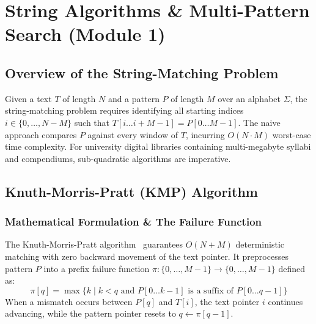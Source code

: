 \chapter{String Algorithms \& Multi-Pattern Search (Module 1)}
\label{ch:string_algorithms}

\section{Overview of the String-Matching Problem}
Given a text $T$ of length $N$ and a pattern $P$ of length $M$ over an alphabet $\Sigma$, the string-matching problem requires identifying all starting indices $i \in \{0, \dots, N - M\}$ such that $T[i \dots i + M - 1] = P[0 \dots M - 1]$. The naive approach compares $P$ against every window of $T$, incurring $O(N \cdot M)$ worst-case time complexity. For university digital libraries containing multi-megabyte syllabi and compendiums, sub-quadratic algorithms are imperative.

\section{Knuth-Morris-Pratt (KMP) Algorithm}
\subsection{Mathematical Formulation \& The Failure Function}
The Knuth-Morris-Pratt algorithm~\cite{kmp1977} guarantees $O(N + M)$ deterministic matching with zero backward movement of the text pointer. It preprocesses pattern $P$ into a prefix failure function $\pi: \{0, \dots, M - 1\} \to \{0, \dots, M - 1\}$ defined as:
\begin{equation}
\pi[q] = \max \{ k \mid k < q \text{ and } P[0 \dots k - 1] \text{ is a suffix of } P[0 \dots q - 1] \}
\end{equation}
When a mismatch occurs between $P[q]$ and $T[i]$, the text pointer $i$ continues advancing, while the pattern pointer resets to $q \gets \pi[q - 1]$.

